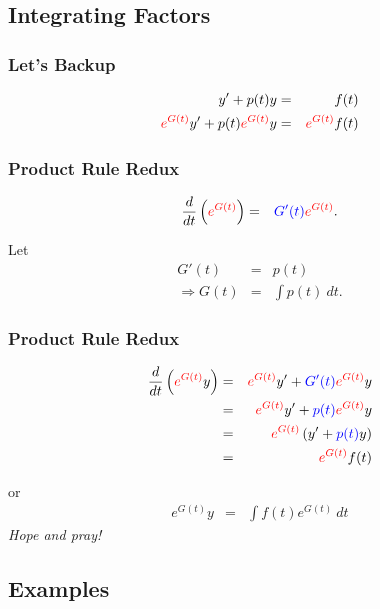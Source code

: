 \subsection{Integrating Factors}

\begin{frame}
  \frametitle{Let's Backup}

  \begin{eqnarray*}
    y' + p(t) y & = & f(t) \\
    {\color{red}e^{G(t)}} y' + p(t) {\color{red}e^{G(t)}} y & = & {\color{red}e^{G(t)}} f(t)
  \end{eqnarray*}


\end{frame}



\begin{frame}
  \frametitle{Product Rule Redux}

  \begin{eqnarray*}
    \frac{d}{dt} \left( {\color{red}e^{G(t)}} \right) & = & {\color{blue}G'(t)} {\color{red}e^{G(t)}}.
  \end{eqnarray*}

  Let
  \begin{eqnarray*}
    G'(t) & = & p(t) \\
    \Rightarrow G(t) & = & \int p(t) ~ dt.
  \end{eqnarray*}


\end{frame}


\begin{frame}
  \frametitle{Product Rule Redux}

  \begin{eqnarray*}
    \frac{d}{dt} \left( {\color{red}e^{G(t)}} y \right) & = & {\color{red}e^{G(t)}} y' + {\color{blue}G'(t)} {\color{red}e^{G(t)}} y \\
    & = & {\color{red}e^{G(t)}} y' + {\color{blue}p(t)} {\color{red}e^{G(t)}} y \\
    & = & {\color{red}e^{G(t)}} \left( y' + {\color{blue}p(t)} y \right) \\
    & = &  {\color{red}e^{G(t)}} f(t)
  \end{eqnarray*}

  or
  \begin{eqnarray*}
    e^{G(t)} y & = & \int f(t) e^{G(t)} ~ dt
  \end{eqnarray*}
  \textit{Hope and pray!}

\end{frame}


\subsection{Examples}

